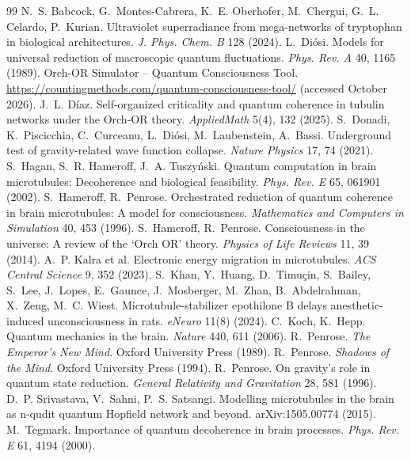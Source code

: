 \documentclass[11pt]{article}
\begin{document}

\begin{thebibliography}{99}
 N.~S. Babcock, G.~Montes-Cabrera, K.~E. Oberhofer, M.~Chergui, G.~L. Celardo, P.~Kurian. Ultraviolet superradiance from mega-networks of tryptophan in biological architectures. \emph{J. Phys. Chem. B} 128 (2024).
 L.~Di\'osi. Models for universal reduction of macroscopic quantum fluctuations. \emph{Phys. Rev. A} 40, 1165 (1989).
 Orch-OR Simulator -- Quantum Consciousness Tool. \url{https://countingmethods.com/quantum-consciousness-tool/} (accessed October 2026).
 J.~L. D\'iaz. Self-organized criticality and quantum coherence in tubulin networks under the Orch-OR theory. \emph{AppliedMath} 5(4), 132 (2025). 
 S.~Donadi, K.~Piscicchia, C.~Curceanu, L.~Di\'osi, M.~Laubenstein, A.~Bassi. Underground test of gravity-related wave function collapse. \emph{Nature Physics} 17, 74 (2021).
 S.~Hagan, S.~R. Hameroff, J.~A. Tuszy\'nski. Quantum computation in brain microtubules: Decoherence and biological feasibility. \emph{Phys. Rev. E} 65, 061901 (2002).
 S.~Hameroff, R.~Penrose. Orchestrated reduction of quantum coherence in brain microtubules: A model for consciousness. \emph{Mathematics and Computers in Simulation} 40, 453 (1996).
 S.~Hameroff, R.~Penrose. Consciousness in the universe: A review of the `Orch OR' theory. \emph{Physics of Life Reviews} 11, 39 (2014).
 A.~P. Kalra et al. Electronic energy migration in microtubules. \emph{ACS Central Science} 9, 352 (2023).
 S.~Khan, Y.~Huang, D.~Timu\c{c}in, S.~Bailey, S.~Lee, J.~Lopes, E.~Gaunce, J.~Mosberger, M.~Zhan, B.~Abdelrahman, X.~Zeng, M.~C. Wiest. Microtubule-stabilizer epothilone B delays anesthetic-induced unconsciousness in rats. \emph{eNeuro} 11(8) (2024).
 C.~Koch, K.~Hepp. Quantum mechanics in the brain. \emph{Nature} 440, 611 (2006).
 R.~Penrose. \emph{The Emperor's New Mind}. Oxford University Press (1989).
 R.~Penrose. \emph{Shadows of the Mind}. Oxford University Press (1994).
 R.~Penrose. On gravity's role in quantum state reduction. \emph{General Relativity and Gravitation} 28, 581 (1996).
 D.~P. Srivastava, V.~Sahni, P.~S. Satsangi. Modelling microtubules in the brain as n-qudit quantum Hopfield network and beyond. arXiv:1505.00774 (2015).
 M.~Tegmark. Importance of quantum decoherence in brain processes. \emph{Phys. Rev. E} 61, 4194 (2000).
\end{thebibliography}
\end{document}
